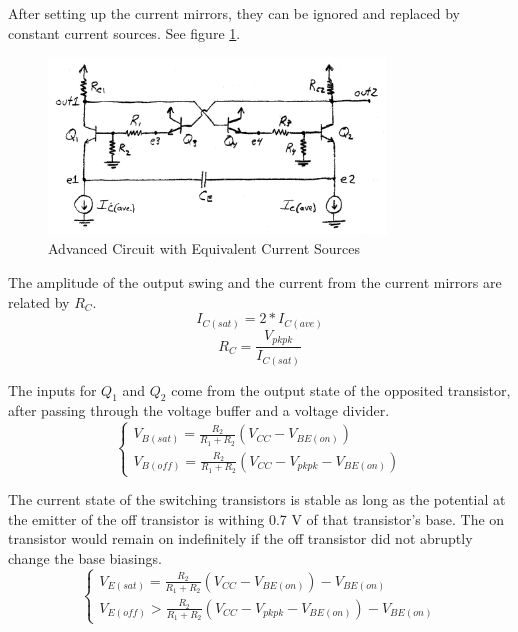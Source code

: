 \documentclass[titlepage, letterpaper, 10.5pt]{article}
\begin{document}
After setting up the current mirrors, they can be ignored and replaced
by constant current sources. See figure \ref{advanced-circuit-without-mirrors}.

\begin{figure}[ht]
	\centering
	\includegraphics[width=0.8\textwidth]{diagrams/advanced-circuit-without-mirrors}
	\caption{Advanced Circuit with Equivalent Current Sources}
	\label{advanced-circuit-without-mirrors}
\end{figure}

The amplitude of the output swing and the current from the current mirrors are related by $R_{C}$.
\begin{equation}
I_{C(sat)}=2*I_{C(ave)}
\end{equation}
\begin{equation}
R_{C}=\frac{V_{pkpk}}{I_{C(sat)}}
\label{advanced-rc-eq}
\end{equation}

The inputs for $Q_{1}$ and $Q_{2}$ come from the output state of the opposited transistor,
after passing through the voltage buffer and a voltage divider.
\begin{equation*}
\left\{\begin{array}{lr}
V_{B(sat)}=\frac{R_{2}}{R_{1}+R_{2}}(V_{CC}-V_{BE(on)})	\\
V_{B(off)}=\frac{R_{2}}{R_{1}+R_{2}}(V_{CC}-V_{pkpk}-V_{BE(on)})
\end{array}\right.
\end{equation*}

The current state of the switching transistors is stable as long as
the potential at the emitter of the off transistor is withing 0.7 V of
that transistor's base. The on transistor would remain on indefinitely
if the off transistor did not abruptly change the base biasings.
\begin{equation}
\left\{\begin{array}{lr}
V_{E(sat)}=\frac{R_{2}}{R_{1}+R_{2}}(V_{CC}-V_{BE(on)})-V_{BE(on)}	\\
V_{E(off)}>\frac{R_{2}}{R_{1}+R_{2}}(V_{CC}-V_{pkpk}-V_{BE(on)})-V_{BE(on)}
\end{array}\right.
\label{advanced-stability-conditions}
\end{equation}
\end{document}
